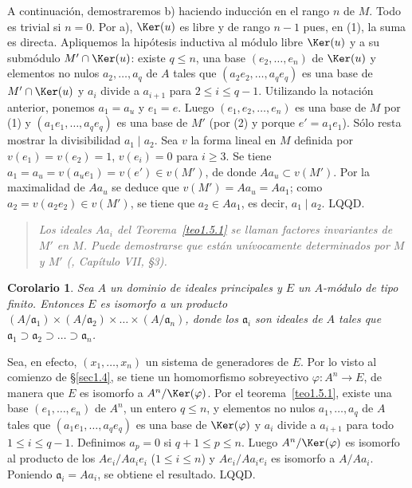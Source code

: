 \documentclass[bibtotoc,leqno,spanish]{amsbook}
\newcommand{\idl}[1]{\mathfrak{#1}}
\newcommand{\QED}{LQQD.}
\renewcommand{\to}[1][]{\xrightarrow{#1}}
\numberwithin{equation}{section}
\newenvironment{comm}%
	{\begin{quotation}\itshape\Small}
	{\end{quotation}}
\theoremstyle{note}
\theoremstyle{note}
\newtheorem{corollary}{Corolario}
\theoremstyle{rem}
\numberwithin{theorem}{section}
\numberwithin{proposition}{section}
\numberwithin{definition}{section}
\numberwithin{lemma}{section}
\numberwithin{corollary}{section}
\numberwithin{example}{section}
\numberwithin{footnote}{section}%
\begin{document}
A continuaci\'on, demostraremos b) haciendo inducci\'on en el rango $n$ de $M$. Todo es trivial
si $n = 0$. Por a), $\Ker(u)$ es libre y de rango $n-1$ pues, en (1), la suma es directa. Apliquemos
la hip\'otesis inductiva al m\'odulo libre $\Ker(u)$ y a su subm\'odulo $M'\cap\Ker(u)$:
existe $q\leq n$, una base $(e_{2},\dots,e_{n})$ de $\Ker(u)$ y elementos no nulos
$a_{2},\dots,a_{q}$ de $A$ tales que $(a_{2}e_{2},\dots,a_{q}e_{q})$ es una base de
$M'\cap\Ker(u)$ y $a_{i}$ divide a $a_{i+1}$ para $2\leq i\leq q-1$. Utilizando la notaci\'on
anterior, ponemos $a_{1} = a_{u}$ y $e_{1} = e$. Luego $(e_{1},e_{2},\dots,e_{n})$ es una base
de $M$ por (1) y $(a_{1}e_{1},\dots,a_{q}e_{q})$ es una base de $M'$ (por (2) y porque
$e' = a_{1}e_{1}$). S\'olo resta mostrar la divisibilidad $a_{1}\mid a_{2}$. Sea $v$ la
forma lineal en $M$ definida por $v(e_{1}) = v(e_{2}) = 1$, $v(e_{i}) = 0$ para $i\geq 3$.
Se tiene $a_{1} = a_{u} = v(a_{u}e_{1}) = v(e')\in v(M')$, de donde $Aa_{u}\subset v(M')$.
Por la maximalidad de $Aa_{u}$ se deduce que $v(M') = Aa_{u} = Aa_{1}$; como $a_{2} = v(a_{2}e_{2})
\in v(M')$, se tiene que $a_{2}\in Aa_{1}$, es decir, $a_{1}\mid a_{2}$. \QED

\begin{comm}
Los ideales $Aa_{i}$ del Teorema~\ref{teo1.5.1} se llaman {\em factores
invariantes} de $M'$ en $M$. Puede demostrarse que est\'an un\'ivocamente determinados
por $M$ y $M'$ (\cite{Bourbaki1}, Cap\'itulo VII, \S3).
\end{comm}

\begin{corollary}\label{cor1.5.1}
Sea $A$ un dominio de ideales principales y $E$ un $A$-m\'odulo
de tipo finito. Entonces $E$ es isomorfo a un producto
$(A/\idl{a}_{1})\times(A/\idl{a}_{2})\times\dots\times
(A/\idl{a}_{n})$, donde los $\idl{a}_{i}$ son ideales de $A$
tales que $\idl{a}_{1}\supset\idl{a}_{2}\supset\dots\supset
\idl{a}_{n}$.
\end{corollary}

Sea, en efecto, $(x_{1},\dots,x_{n})$ un sistema de generadores de $E$. Por lo visto
al comienzo de \S\ref{sec1.4}, se tiene un homomorfismo sobreyectivo $\varphi:A^{n}\to E$, de manera
que $E$ es isomorfo a $A^{n}/\Ker(\varphi)$. Por el teorema~\ref{teo1.5.1},
existe una base $(e_{1},\dots,e_{n})$
de $A^{n}$, un entero $q\leq n$, y elementos no nulos $a_{1},\dots,a_{q}$ de $A$ tales que
$(a_{1}e_{1},\dots,a_{q}e_{q})$ es una base de $\Ker(\varphi)$ y $a_{i}$ divide a $a_{i+1}$ para
todo $1\leq i\leq q-1$. Definimos $a_{p} = 0$ si $q+1\leq p\leq n$. Luego $A^{n}/\Ker(\varphi)$
es isomorfo al producto de los $Ae_{i}/Aa_{i}e_{i}$ ($1\leq i\leq n$) y $Ae_{i}/Aa_{i}e_{i}$
es isomorfo a $A/Aa_{i}$. Poniendo $\idl{a}_{i} = Aa_{i}$, se obtiene el resultado. \QED
\end{document}
